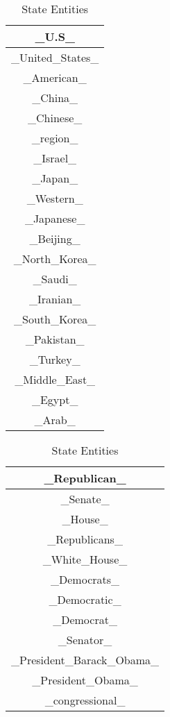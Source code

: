 \documentclass{article}
\begin{document}
\begin{table}[ht]
    \parbox{.22\linewidth}{
    \centering
    \begin{tabular}{|c|}
    \hline
    \_U.S\_\\
    \hline
    \_United\_States\_\\
    \hline
    \_American\_\\
    \hline
    \_China\_\\
    \hline
    \_Chinese\_\\
    \hline
    \_region\_\\
    \hline
    \_Israel\_\\
    \hline
    \_Japan\_\\
    \hline
    \_Western\_\\
    \hline
    \_Japanese\_\\
    \hline
    \_Beijing\_\\
    \hline
    \_North\_Korea\_\\
    \hline
    \_Saudi\_\\
    \hline
    \_Iranian\_\\
    \hline
    \_South\_Korea\_\\
    \hline
    \_Pakistan\_\\
    \hline
    \_Turkey\_\\
    \hline
    \_Middle\_East\_\\
    \hline
    \_Egypt\_\\
    \hline
    \_Arab\_\\
    \hline
    \end{tabular}
    \caption{State Entities}
    }
    \hfill
    \parbox{.3\linewidth}{
    \centering
    \begin{tabular}{|c|}
    \hline
    \_Republican\_\\
    \hline
    \_Senate\_\\
    \hline
    \_House\_\\
    \hline
    \_Republicans\_\\
    \hline
    \_White\_House\_\\
    \hline
    \_Democrats\_\\
    \hline
    \_Democratic\_\\
    \hline
    \_Democrat\_\\
    \hline
    \_Senator\_\\
    \hline
    \_President\_Barack\_Obama\_\\
    \hline
    \_President\_Obama\_\\
    \hline
    \_congressional\_\\

\end{tabular}}
\end{table}
\end{document}
